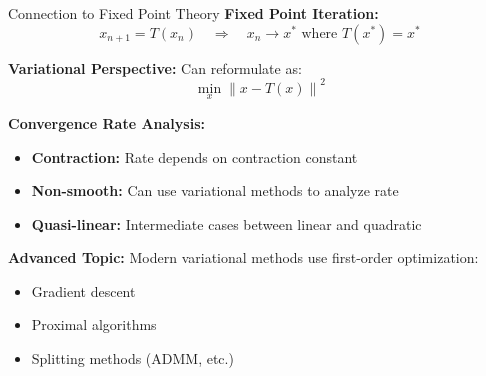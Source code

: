 \documentclass[aspectratio=169,10pt]{beamer}
\newcommand{\norm}[1]{\left\lVert #1 \right\rVert}
\begin{document}
\begin{frame}{Connection to Fixed Point Theory}
  \textbf{Fixed Point Iteration:}
  \[
    x_{n+1} = T(x_n) \quad \Rightarrow \quad x_n \to x^* \text{ where } T(x^*) = x^*
  \]

  \vspace{0.3cm}
  \textbf{Variational Perspective:} Can reformulate as:
  \[
    \min_{x} \norm{x - T(x)}^2
  \]

  \vspace{0.3cm}
  \textbf{Convergence Rate Analysis:}
  \begin{itemize}
    \item \textbf{Contraction:} Rate depends on contraction constant
    \item \textbf{Non-smooth:} Can use variational methods to analyze rate
    \item \textbf{Quasi-linear:} Intermediate cases between linear and quadratic
  \end{itemize}

  \vspace{0.3cm}
  \textbf{Advanced Topic:} Modern variational methods use first-order optimization:
  \begin{itemize}
    \item Gradient descent
    \item Proximal algorithms
    \item Splitting methods (ADMM, etc.)
  \end{itemize}
\end{frame}
\end{document}
